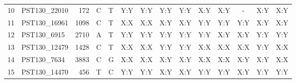 \begin{tabular}{rlrll|cc|cc|ccc|cc}
  10 & PST130\_22010 & 172      & C        & T        & Y:Y                & Y:Y    & Y:Y                 & Y:Y    & X:Y                  & X:Y   & -      & X:Y                 & X:Y   \\
  11 & PST130\_16961 & 1098     & C        & T        & X:X                & X:X    & X:Y                 & X:Y    & Y:Y                  & Y:Y   & Y:Y    & X:Y                 & X:Y   \\
  12 & PST130\_6915  & 2710     & A        & T        & Y:Y                & Y:Y    & Y:Y                 & Y:Y    & Y:Y                  & X:Y   & X:Y    & Y:Y                 & Y:Y   \\
  13 & PST130\_12479 & 1428     & C        & T        & X:X                & X:X    & Y:Y                 & Y:Y    & X:X                  & X:X   & X:X    & Y:Y                 & X:X   \\
  14 & PST130\_7634  & 3883     & C        & G        & X:X                & X:X    & X:Y                 & X:Y    & X:X                  & X:X   & X:Y    & X:Y                 & X:X   \\
  15 & PST130\_14470 & 456      & T        & C        & Y:Y                & Y:Y    & X:Y                 & X:Y    & Y:Y                  & Y:Y   & X:Y    & Y:Y                 & Y:Y   \\
\bottomrule
\end{tabular}
